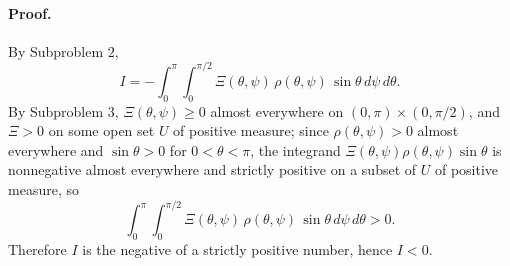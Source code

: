 \paragraph{Proof.}
By Subproblem $2$,
\[
I=-\int_{0}^{\pi}\int_{0}^{\pi/2}\Xi(\theta,\psi)\,\rho(\theta,\psi)\,\sin\theta\,d\psi\,d\theta.
\]
By Subproblem $3$, $\Xi(\theta,\psi)\ge 0$ almost everywhere on $(0,\pi)\times(0,\pi/2)$, and $\Xi>0$ on some open set $U$ of positive measure; since $\rho(\theta,\psi)>0$ almost everywhere and $\sin\theta>0$ for $0<\theta<\pi$, the integrand $\Xi(\theta,\psi)\rho(\theta,\psi)\sin\theta$ is nonnegative almost everywhere and strictly positive on a subset of $U$ of positive measure, so
\[
\int_{0}^{\pi}\int_{0}^{\pi/2}\Xi(\theta,\psi)\,\rho(\theta,\psi)\,\sin\theta\,d\psi\,d\theta>0.
\]
Therefore $I$ is the negative of a strictly positive number, hence $I<0$.